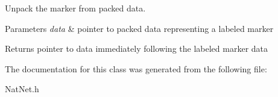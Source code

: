 \-Unpack the marker from packed data. 


\begin{DoxyParams}{\-Parameters}
{\em data} & pointer to packed data representing a labeled marker \\
\hline
\end{DoxyParams}
\begin{DoxyReturn}{\-Returns}
pointer to data immediately following the labeled marker data 
\end{DoxyReturn}


\-The documentation for this class was generated from the following file\-:\begin{DoxyCompactItemize}
\item 
\-Nat\-Net.\-h\end{DoxyCompactItemize}
